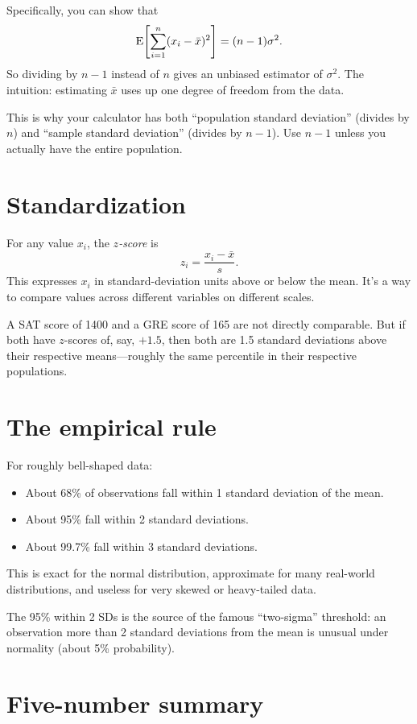 Specifically, you can show that
\[
  \operatorname{E}\!\left[\sum_{i=1}^{n}(x_i - \bar{x})^2\right] = (n-1)\sigma^2.
\]
So dividing by $n - 1$ instead of $n$ gives an unbiased estimator of $\sigma^2$. The intuition: estimating $\bar{x}$ uses up one degree of freedom from the data.

This is why your calculator has both ``population standard deviation'' (divides by $n$) and ``sample standard deviation'' (divides by $n - 1$). Use $n - 1$ unless you actually have the entire population.

\section{Standardization}

For any value $x_i$, the \emph{$z$-score} is
\begin{equation}
  z_i = \frac{x_i - \bar{x}}{s}.
\end{equation}
This expresses $x_i$ in standard-deviation units above or below the mean. It's a way to compare values across different variables on different scales.

A SAT score of 1400 and a GRE score of 165 are not directly comparable. But if both have $z$-scores of, say, $+1.5$, then both are 1.5 standard deviations above their respective means---roughly the same percentile in their respective populations.

\section{The empirical rule}

For roughly bell-shaped data:
\begin{itemize}[noitemsep]
\item About 68\% of observations fall within 1 standard deviation of the mean.
\item About 95\% fall within 2 standard deviations.
\item About 99.7\% fall within 3 standard deviations.
\end{itemize}
This is exact for the normal distribution, approximate for many real-world distributions, and useless for very skewed or heavy-tailed data.

The 95\% within 2 SDs is the source of the famous ``two-sigma'' threshold: an observation more than 2 standard deviations from the mean is unusual under normality (about 5\% probability).

\section{Five-number summary}

